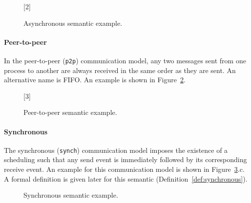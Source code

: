\begin{figure}[!ht]
    \centering
      \begin{msc}[draw frame=none, draw head=none, msc keyword=, 
                  head height=0px, label distance=0.5ex, 
                  foot height=0px, foot distance=0px]{}

          [2]
          \nextlevel
      \end{msc}
  \caption{Asynchronous semantic example.}
  \label{fig:asy}
\end{figure}

\paragraph{Peer-to-peer} 
In the peer-to-peer (\verb|p2p|) communication model, any two messages sent from one 
process to another are always received in the same order as they are sent.
An alternative name is FIFO. An example is shown in Figure~\ref{fig:p2p}.

\begin{figure}[!ht]
    \centering
      \begin{msc}[draw frame=none, draw head=none, msc keyword=, 
                    head height=0px, label distance=0.5ex, 
                    foot height=0px, foot distance=0px]{}

            [3]
            \nextlevel
            \nextlevel
        \end{msc}
  \caption{Peer-to-peer semantic example.}
  \label{fig:p2p}
\end{figure}

\paragraph{Synchronous}
The synchronous (\verb|synch|) communication model imposes 
the existence of a scheduling such that any send event is 
immediately followed by its corresponding receive event. 
An example for this communication model is shown in 
Figure~\ref{fig:sync}.c. A formal definition is given later 
for this semantic (Definition~\ref{def:synchronous}).

\begin{figure}[!ht]
    \centering
      \begin{msc}[draw frame=none, draw head=none, msc keyword=, 
                  head height=0px, label distance=0.5ex, 
                  foot height=0px, foot distance=0px]{}

          \nextlevel
      \end{msc}
  \caption{Synchronous semantic example.}
  \label{fig:sync}
\end{figure}

